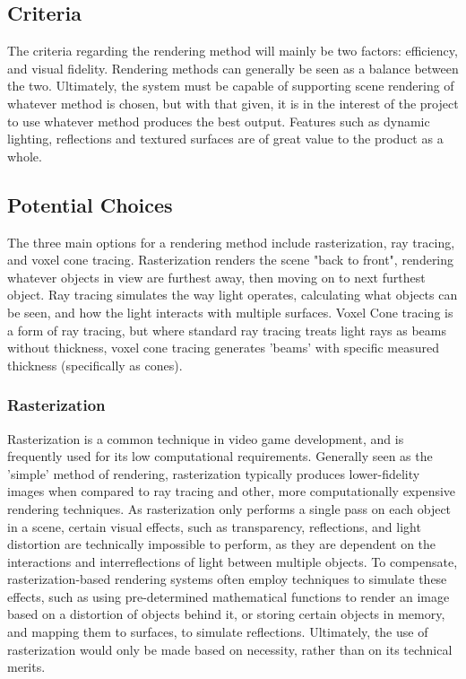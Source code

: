 \documentclass[onecolumn, draftclsnofoot,10pt, compsoc]{IEEEtran}
\begin{document}
\subsection{Criteria}
The criteria regarding the rendering method will mainly be two factors: efficiency, and visual fidelity. Rendering methods can generally be seen as a balance between the two. Ultimately, the system must be capable of supporting scene rendering of whatever method is chosen, but with that given, it is in the interest of the project to use whatever method produces the best output. Features such as dynamic lighting, reflections and textured surfaces are of great value to the product as a whole.

\subsection{Potential Choices}
The three main options for a rendering method include rasterization, ray tracing, and voxel cone tracing. Rasterization renders the scene "back to front", rendering whatever objects in view are furthest away, then moving on to next furthest object. Ray tracing simulates the way light operates, calculating what objects can be seen, and how the light interacts with multiple surfaces. Voxel Cone tracing is a form of ray tracing, but where standard ray tracing treats light rays as beams without thickness, voxel cone tracing generates 'beams' with specific measured thickness (specifically as cones).

\subsubsection{Rasterization}
Rasterization is a common technique in video game development, and is frequently used for its low computational requirements. Generally seen as the 'simple' method of rendering, rasterization typically produces lower-fidelity images when compared to ray tracing and other, more computationally expensive rendering techniques. As rasterization only performs a single pass on each object in a scene, certain visual effects, such as transparency, reflections, and light distortion are technically impossible to perform, as they are dependent on the interactions and interreflections of light between multiple objects. To compensate, rasterization-based rendering systems often employ techniques to simulate these effects, such as using pre-determined mathematical functions to render an image based on a distortion of objects behind it, or storing certain objects in memory, and mapping them to surfaces, to simulate reflections. Ultimately, the use of rasterization would only be made based on necessity, rather than on its technical merits.
\end{document}
